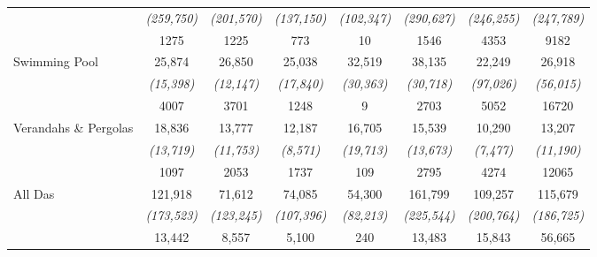 \begin{table}[!htbp]
{\begin{tabular}{rccccccc}
          & \textit{(259,750)} & \textit{(201,570)} & \textit{(137,150)} & \textit{(102,347)} & \textit{(290,627)} & \textit{(246,255)} & \textit{(247,789)} \\
          & 1275  & 1225  & 773   & 10    & 1546  & 4353  & 9182 \\
    \multicolumn{1}{l}{Swimming Pool} & 25,874 & 26,850 & 25,038 & 32,519 & 38,135 & 22,249 & 26,918 \\
          & \textit{(15,398)} & \textit{(12,147)} & \textit{(17,840)} & \textit{(30,363)} & \textit{(30,718)} & \textit{(97,026)} & \textit{(56,015)} \\
          & 4007  & 3701  & 1248  & 9     & 2703  & 5052  & 16720 \\
    \multicolumn{1}{l}{Verandahs \& Pergolas} & 18,836 & 13,777 & 12,187 & 16,705 & 15,539 & 10,290 & 13,207 \\
          & \textit{(13,719)} & \textit{(11,753)} & \textit{(8,571)} & \textit{(19,713)} & \textit{(13,673)} & \textit{(7,477)} & \textit{(11,190)} \\
          & 1097  & 2053  & 1737  & 109   & 2795  & 4274  & 12065 \\
    \multicolumn{1}{l}{All Das} & 121,918 & 71,612 & 74,085 & 54,300 & 161,799 & 109,257 & 115,679 \\
          & \textit{(173,523)} & \textit{(123,245)} & \textit{(107,396)} & \textit{(82,213)} & \textit{(225,544)} & \textit{(200,764)} & \textit{(186,725)} \\
          & 13,442 & 8,557 & 5,100 & 240   & 13,483 & 15,843 & 56,665 \\
    \bottomrule
    \end{tabular}%
    }
  \label{tab:DA_stats_rs_level}%
\end{table}%
